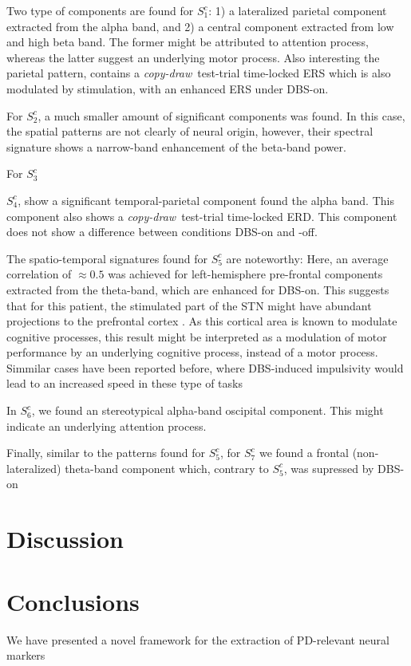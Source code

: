\documentclass[10pt,a4paper]{article}
\newcommand{\cpdt}[0]{\textit{copy-draw}~test}
\newcommand{\patient}[2]{$S_{#1}^{#2}$}
\begin{document}
Two type of components are found for \patient{1}{c}: 1) a lateralized parietal component extracted from the alpha band, and 2) a central component extracted from low and high beta band. The former might be attributed to attention process, whereas the latter suggest an underlying motor process. Also interesting the parietal pattern, contains a \cpdt-trial time-locked ERS which is also modulated by stimulation, with an enhanced ERS under DBS-on. 

For \patient{2}{c}, a much smaller amount of significant components was found. In this case, the spatial patterns are not clearly of neural origin, however, their spectral signature shows a narrow-band enhancement of the beta-band power.

For \patient{3}{c} 

\patient{4}{c}, show a significant temporal-parietal component found the alpha band. This component also shows a \cpdt-trial time-locked ERD. This component does not show a difference between conditions DBS-on and -off.

The spatio-temporal signatures found for \patient{5}{c} are noteworthy: Here, an average correlation of $\approx0.5$ was achieved for left-hemisphere pre-frontal components extracted from the theta-band, which are enhanced for DBS-on. This suggests that for this patient, the stimulated part of the STN might have abundant projections to the prefrontal cortex . As this cortical area is known to modulate cognitive processes, this result might be interpreted as a modulation of motor performance by an underlying cognitive process, instead of a motor process. Simmilar cases have been reported before, where DBS-induced impulsivity would lead to an increased speed in these type of tasks \cite{IMPULSIVITY DBS}

In \patient{6}{c}, we found an stereotypical alpha-band oscipital component. This might indicate an underlying attention process. 

Finally, similar to the patterns found for \patient{5}{c}, for \patient{7}{c} we found a frontal (non-lateralized) theta-band component which, contrary to \patient{5}{c}, was supressed by DBS-on


\section{Discussion}






\section{Conclusions}
We have presented a novel framework for the extraction of PD-relevant neural markers




\end{document}
